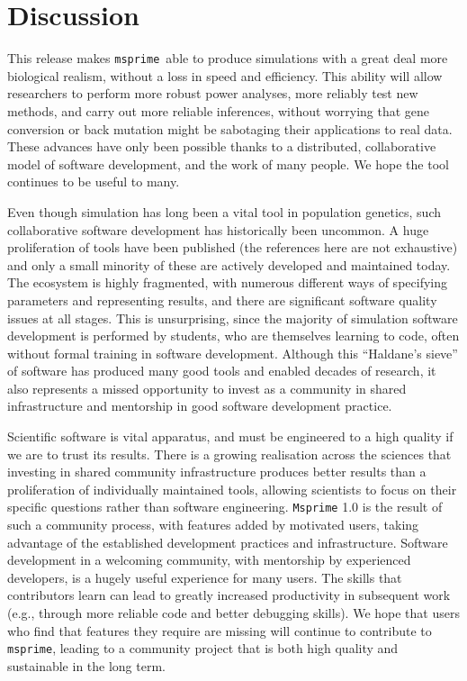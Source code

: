 \documentclass{article}
\newcommand{\msprime}[0]{\texttt{msprime}}
\begin{document}
\section*{Discussion}


This release makes \msprime\ able to produce simulations
with a great deal more biological realism, without a loss in speed and efficiency.
This ability will allow researchers to perform more robust
power analyses, more reliably test new methods,
and carry out more reliable inferences,
without worrying that gene conversion or back mutation might be sabotaging
their applications to real data.
These advances have only been possible thanks to a distributed,
collaborative model of software development,
and the work of many people.
We hope the tool continues to be useful to many.


Even though simulation has long been a vital tool in population genetics,
such collaborative software development has historically been uncommon.
A huge proliferation of tools have been published
(the references here are not exhaustive)
and only a small minority of these are actively developed and
maintained today. The ecosystem is highly fragmented, with numerous different
ways of specifying parameters and representing results, and there are
significant software quality issues at all stages. This is unsurprising, since
the majority of simulation software development is performed by students, who
are themselves learning to code, often without formal training in software
development.
Although this ``Haldane's sieve'' of software has produced many good tools
and enabled decades of research,
it also represents a missed opportunity to invest as a community
in shared infrastructure and mentorship in good software development practice.

Scientific software is vital apparatus, and must be engineered
to a high quality if we are to trust its results. There is a growing
realisation across the sciences \citet[OTHER CITATIONS]{siepel2019challenges}
that investing in
shared community infrastructure produces better results than a
proliferation of individually maintained tools, allowing scientists
to focus on their specific questions rather than software engineering.
\texttt{Msprime} 1.0 is the result of such a community process,
with features added by motivated users, taking advantage of the
established development practices and infrastructure.
Software development in a welcoming community,
with mentorship by experienced developers,
is a hugely useful experience for many users.
The skills that contributors learn
can lead to greatly increased productivity in subsequent
work (e.g., through more reliable code and better debugging skills).
We hope that users who find that
features they require are missing will continue to contribute to
\msprime, leading to a community project that is both high quality
and sustainable in the long term.
\end{document}
